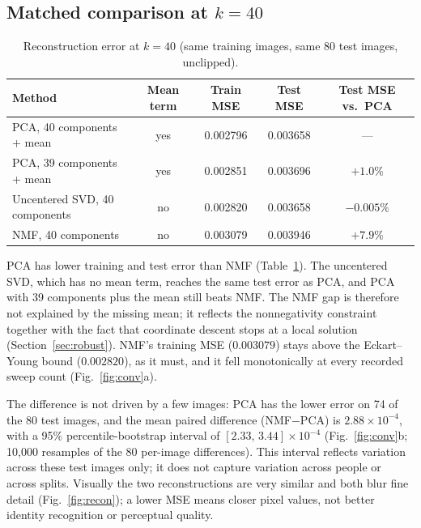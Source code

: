 \documentclass[10pt]{article}
\begin{document}
\subsection{Matched comparison at \texorpdfstring{$k=40$}{k = 40}}
\begin{table}[!t]
\centering\small
\caption{Reconstruction error at $k=40$ (same training images, same 80 test images, unclipped).}\label{tab:k40}
\begin{tabular}{lcccc}
\toprule
Method & Mean term & Train MSE & Test MSE & Test MSE vs.\ PCA\\
\midrule
PCA, 40 components + mean & yes & 0.002796 & 0.003658 & ---\\
PCA, 39 components + mean & yes & 0.002851 & 0.003696 & $+1.0\%$\\
Uncentered SVD, 40 components & no & 0.002820 & 0.003658 & $-0.005\%$\\
NMF, 40 components & no & 0.003079 & 0.003946 & $+7.9\%$\\
\bottomrule
\end{tabular}
\end{table}
PCA has lower training and test error than NMF (Table~\ref{tab:k40}). The uncentered SVD, which has no mean term, reaches the same test error as PCA, and PCA with 39 components plus the mean still beats NMF. The NMF gap is therefore not explained by the missing mean; it reflects the nonnegativity constraint together with the fact that coordinate descent stops at a local solution (Section~\ref{sec:robust}). NMF's training MSE ($0.003079$) stays above the Eckart--Young bound ($0.002820$), as it must, and it fell monotonically at every recorded sweep count (Fig.~\ref{fig:conv}a).

The difference is not driven by a few images: PCA has the lower error on 74 of the 80 test images, and the mean paired difference (NMF$-$PCA) is $2.88\times10^{-4}$, with a 95\% percentile-bootstrap interval of $[2.33,\,3.44]\times10^{-4}$ (Fig.~\ref{fig:conv}b; 10{,}000 resamples of the 80 per-image differences). This interval reflects variation across these test images only; it does not capture variation across people or across splits. Visually the two reconstructions are very similar and both blur fine detail (Fig.~\ref{fig:recon}); a lower MSE means closer pixel values, not better identity recognition or perceptual quality.
\end{document}
